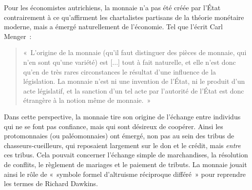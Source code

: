 
Pour les économistes autrichiens, la monnaie n'a pas été créée par l'État contrairement à ce qu'affirment les chartalistes partisans de la théorie monétaire moderne, mais a émergé naturellement de l'économie. Tel que l'écrit Carl Menger~:

\begin{quote}
«~L'origine de la monnaie (qu'il faut distinguer des pièces de monnaie, qui n'en sont qu'une variété) est [...] tout à fait naturelle, et elle n'est donc qu'en de très rares circonstances le résultat d'une influence de la législation. La monnaie n'est ni une invention de l'État, ni le produit d'un acte législatif, et la sanction d'un tel acte par l'autorité de l'État est donc étrangère à la notion même de monnaie.~»
\end{quote} %

Dans cette perspective, la monnaie tire son origine de l'échange entre individus qui ne se font pas confiance, mais qui sont désireux de coopérer. Ainsi les protomonnaies (ou paléomonnaies) ont émergé, non pas au sein des tribus de chasseurs-cueilleurs, qui reposaient largement sur le don et le crédit, mais \emph{entre} ces tribus. Cela pouvait concerner l'échange simple de marchandises, la résolution de conflits, le règlement de mariages et le paiement de tributs. La monnaie jouait ainsi le rôle de «~symbole formel d'altruisme réciproque différé~» pour reprendre les termes de Richard Dawkins.

